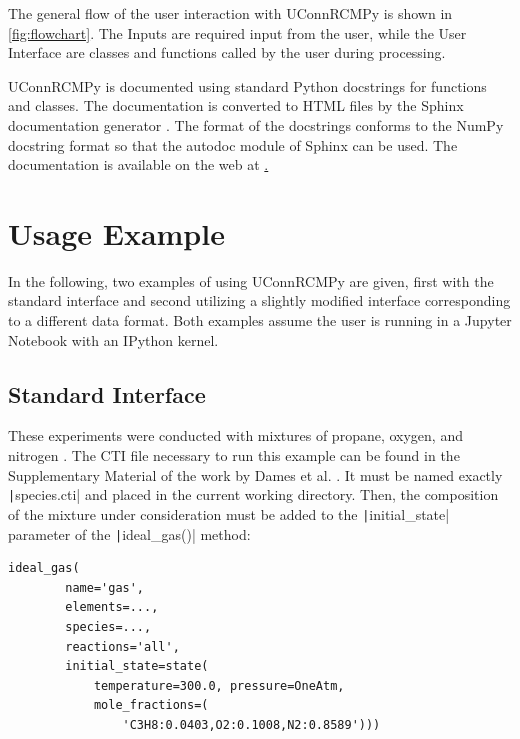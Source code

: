 \documentclass[12pt]{../ussci}
\begin{document}
The general flow of the user interaction with UConnRCMPy is shown in
\cref{fig:flowchart}. The Inputs are required input from the
user, while the User Interface are classes and functions called by the
user during processing.

UConnRCMPy is documented using standard Python docstrings for functions
and classes. The documentation is converted to HTML files by the Sphinx
documentation generator \autocite{Brandl2016}. The format of the
docstrings conforms to the NumPy docstring format so that the autodoc
module of Sphinx can be used. The documentation is available on the web
at \href{https://bryanwweber.github.io/UConnRCMPy/}.

\section{Usage Example}\label{usage-example}

In the following, two examples of using UConnRCMPy are given, first with
the standard interface and second utilizing a slightly modified
interface corresponding to a different data format. Both examples assume
the user is running in a Jupyter Notebook with an IPython kernel.

\subsection{Standard Interface}\label{standard-interface}

These experiments were conducted with mixtures of propane, oxygen, and
nitrogen \autocite{Dames2016}. The CTI file necessary to run this
example can be found in the Supplementary Material of the work by Dames
et al. \autocite{Dames2016}. It must be named exactly
\texttt|species.cti| and placed in the current working directory. Then,
the composition of the mixture under consideration must be added to the
\texttt|initial_state| parameter of the \texttt|ideal_gas()| method:

\begin{verbatim}
ideal_gas(
        name='gas',
        elements=...,
        species=...,
        reactions='all',
        initial_state=state(
            temperature=300.0, pressure=OneAtm,
            mole_fractions=(
                'C3H8:0.0403,O2:0.1008,N2:0.8589')))
\end{verbatim}
\end{document}
